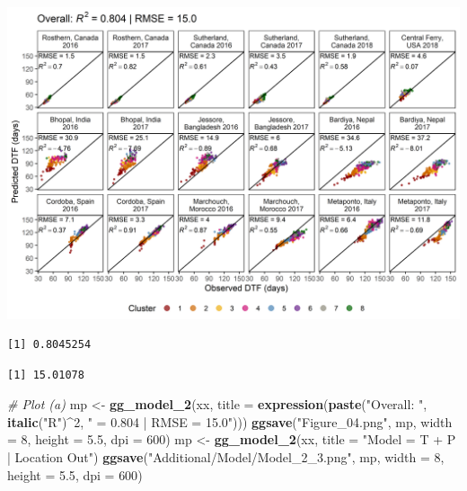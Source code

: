 \documentclass[
]{article}
\newenvironment{Shaded}{\begin{snugshade}}{\end{snugshade}}
\newcommand{\CommentTok}[1]{\textcolor[rgb]{0.56,0.35,0.01}{\textit{#1}}}
\newcommand{\DataTypeTok}[1]{\textcolor[rgb]{0.13,0.29,0.53}{#1}}
\newcommand{\DecValTok}[1]{\textcolor[rgb]{0.00,0.00,0.81}{#1}}
\newcommand{\FloatTok}[1]{\textcolor[rgb]{0.00,0.00,0.81}{#1}}
\newcommand{\KeywordTok}[1]{\textcolor[rgb]{0.13,0.29,0.53}{\textbf{#1}}}
\newcommand{\NormalTok}[1]{#1}
\newcommand{\OperatorTok}[1]{\textcolor[rgb]{0.81,0.36,0.00}{\textbf{#1}}}
\newcommand{\StringTok}[1]{\textcolor[rgb]{0.31,0.60,0.02}{#1}}
\begin{document}
\includegraphics{Figure_04.png}

\begin{Shaded}
\end{Shaded}

\begin{verbatim}
[1] 0.8045254
\end{verbatim}

\begin{Shaded}
\end{Shaded}

\begin{verbatim}
[1] 15.01078
\end{verbatim}

\begin{Shaded}
\begin{Highlighting}[]
\CommentTok{# Plot (a)}
\NormalTok{mp <-}\StringTok{ }\KeywordTok{gg_model_2}\NormalTok{(xx, }\DataTypeTok{title =} \KeywordTok{expression}\NormalTok{(}\KeywordTok{paste}\NormalTok{(}\StringTok{"Overall: "}\NormalTok{,}
        \KeywordTok{italic}\NormalTok{(}\StringTok{"R"}\NormalTok{)}\OperatorTok{^}\DecValTok{2}\NormalTok{, }\StringTok{" = 0.804 | RMSE = 15.0"}\NormalTok{)))}
\KeywordTok{ggsave}\NormalTok{(}\StringTok{"Figure_04.png"}\NormalTok{, mp, }\DataTypeTok{width =} \DecValTok{8}\NormalTok{, }\DataTypeTok{height =} \FloatTok{5.5}\NormalTok{, }\DataTypeTok{dpi =} \DecValTok{600}\NormalTok{)}
\NormalTok{mp <-}\StringTok{ }\KeywordTok{gg_model_2}\NormalTok{(xx, }\DataTypeTok{title =} \StringTok{"Model = T + P | Location Out"}\NormalTok{)}
\KeywordTok{ggsave}\NormalTok{(}\StringTok{"Additional/Model/Model_2_3.png"}\NormalTok{, mp, }\DataTypeTok{width =} \DecValTok{8}\NormalTok{, }\DataTypeTok{height =} \FloatTok{5.5}\NormalTok{, }\DataTypeTok{dpi =} \DecValTok{600}\NormalTok{)}
\end{Highlighting}
\end{Shaded}
\end{document}
